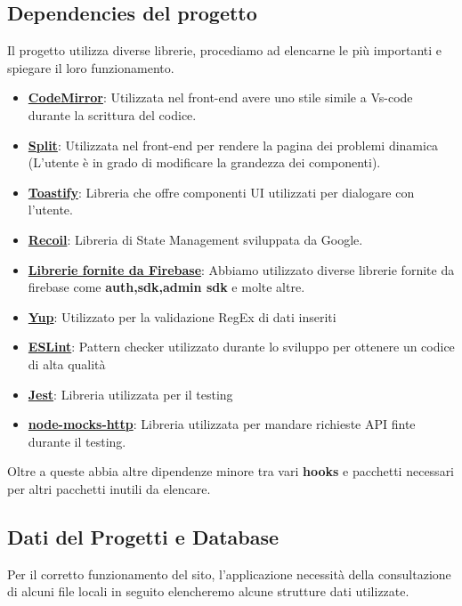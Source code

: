 \documentclass[11pt, a4paper]{article}
\theoremstyle{definition}
\begin{document}
\subsection{Dependencies del progetto}
Il progetto utilizza diverse librerie, procediamo ad elencarne le più importanti e spiegare il loro funzionamento.
\begin{itemize}
  \item \href{https://codemirror.net/}{\textbf{CodeMirror}}: Utilizzata nel front-end avere uno stile simile a Vs-code durante la scrittura del codice.
  \item \href{https://split.js.org/}{\textbf{Split}}: Utilizzata nel front-end per rendere la pagina dei problemi dinamica (L'utente è in grado di modificare la grandezza dei componenti).
  \item \href{https://www.npmjs.com/package/react-toastify}{\textbf{Toastify}}: Libreria che offre componenti UI utilizzati per dialogare con l'utente.
  \item \href{https://recoiljs.org/}{\textbf{Recoil}}: Libreria di State Management sviluppata da Google.
  \item \href{https://firebase.google.com/docs/build}{\textbf{Librerie fornite da Firebase}}: Abbiamo utilizzato diverse librerie fornite da firebase come \textbf{auth,sdk,admin sdk} e molte altre.
  \item \href{https://www.npmjs.com/package/yup}{\textbf{Yup}}: Utilizzato per la validazione RegEx di dati inseriti
  \item \href{https://eslint.org/}{\textbf{ESLint}}: Pattern checker utilizzato durante lo sviluppo per ottenere un codice di alta qualità
  \item \href{https://jestjs.io/}{\textbf{Jest}}: Libreria utilizzata per il testing
  \item \href{https://www.npmjs.com/package/node-mocks-http}{\textbf{node-mocks-http}}: Libreria utilizzata per mandare richieste API finte durante il testing.
\end{itemize}
Oltre a queste abbia altre dipendenze minore tra vari \textbf{hooks} e pacchetti necessari per altri pacchetti inutili da elencare.
\subsection{Dati del Progetti e Database}
Per il corretto funzionamento del sito, l'applicazione necessità della consultazione di alcuni file locali in seguito elencheremo alcune strutture dati utilizzate.
\end{document}
